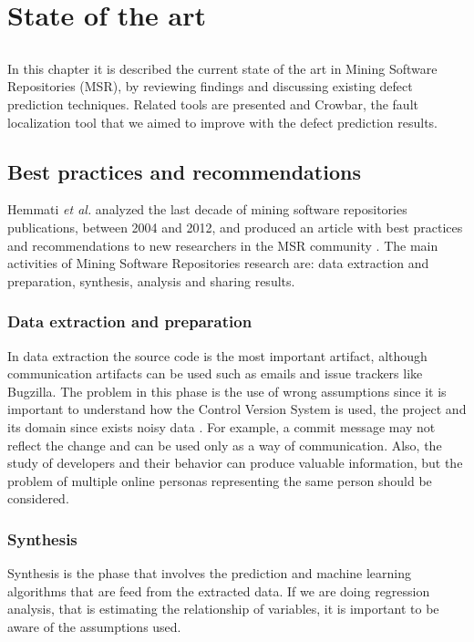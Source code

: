 \chapter{State of the art} \label{chap:sota}

\section*{}
In this chapter it is described the current state of the art in Mining Software
Repositories (MSR), by reviewing findings and discussing existing defect
prediction techniques. Related tools are presented and Crowbar, the fault
localization tool that we aimed to improve with the defect prediction results.

\section{Best practices and recommendations}
Hemmati \textit{et al.} analyzed the last decade of mining software
repositories publications, between 2004 and 2012, and produced an article
with best practices and recommendations to new researchers in the MSR
community \cite{Hemmati2013}. The main activities of Mining Software
Repositories research are: data extraction and preparation, synthesis,
analysis and sharing results.

\subsection{Data extraction and preparation}
In data extraction the source code is the most important artifact, although
communication artifacts can be used such as emails and issue trackers like
Bugzilla. The problem in this phase is the use of wrong assumptions since it
is important to understand how the Control Version System is used, the
project and its domain since exists noisy data \cite{herzig-tr-2012}. For
example, a commit message may not reflect the change and can be used only as
a way of communication. Also, the study of developers and their behavior can
produce valuable information, but the problem of multiple online personas
representing the same person should be considered.

\subsection{Synthesis}
Synthesis is the phase that involves the prediction and machine learning
algorithms that are feed from the extracted data. If we are doing regression
analysis, that is estimating the relationship of variables, it is important to
be aware of the assumptions used.

